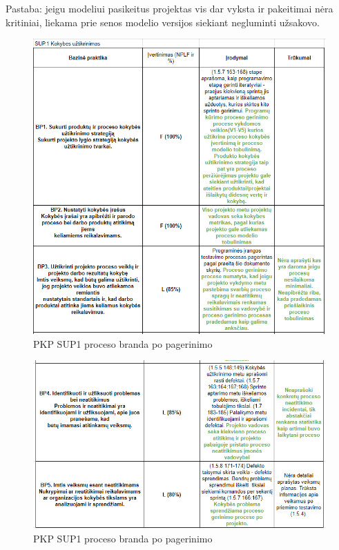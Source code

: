 \documentclass{VUMIFPSkursinis}
\begin{document}
	Pastaba: jeigu modeliui pasikeitus projektas vis dar vyksta ir pakeitimai nėra kritiniai, liekama prie senos modelio versijos siekiant negluminti užsakovo.	

	\begin{figure}[htbp]
		\includegraphics[scale=0.9]{img/sup1one}
		\caption{PKP SUP1 proceso branda po pagerinimo} %
		\label{img:pkpPries}
	\end{figure}	

	\begin{figure}[htbp]
		\includegraphics[scale=0.9]{img/sup1two}
		\caption{PKP SUP1 proceso branda po pagerinimo} %
		\label{img:pkpPries}
	\end{figure}	
\end{document}

